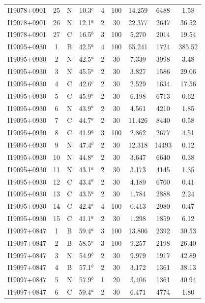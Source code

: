 \begin{table}
\begin{tabular}{ccccccccc}
I19078+0901 & 25 & N & 10.3$^{c}$ & 4 & 100 & 14.259 & 6488 & 1.58 \\
I19078+0901 & 26 & N & 12.1$^{a}$ & 2 & 30 & 22.377 & 2647 & 36.52 \\
I19078+0901 & 27 & C & 16.5$^{b}$ & 3 & 100 & 5.270 & 2014 & 19.54 \\
I19095+0930 & 1 & B & 42.5$^{a}$ & 4 & 100 & 65.241 & 1724 & 385.52 \\
I19095+0930 & 2 & N & 42.5$^{a}$ & 2 & 30 & 7.339 & 3998 & 3.48 \\
I19095+0930 & 3 & N & 45.5$^{a}$ & 2 & 30 & 3.827 & 1586 & 29.06 \\
I19095+0930 & 4 & C & 42.6$^{c}$ & 2 & 30 & 2.529 & 1634 & 17.56 \\
I19095+0930 & 5 & C & 45.9$^{a}$ & 2 & 30 & 6.198 & 6713 & 0.62 \\
I19095+0930 & 6 & N & 43.9$^{a}$ & 2 & 30 & 4.561 & 4210 & 1.85 \\
I19095+0930 & 7 & C & 44.7$^{a}$ & 2 & 30 & 11.426 & 8440 & 0.58 \\
I19095+0930 & 8 & C & 41.9$^{a}$ & 3 & 100 & 2.862 & 2677 & 4.51 \\
I19095+0930 & 9 & N & 47.4$^{b}$ & 2 & 30 & 12.318 & 14493 & 0.12 \\
I19095+0930 & 10 & N & 44.8$^{a}$ & 2 & 30 & 3.647 & 6640 & 0.38 \\
I19095+0930 & 11 & N & 43.1$^{a}$ & 2 & 30 & 3.173 & 4145 & 1.35 \\
I19095+0930 & 12 & C & 43.4$^{a}$ & 2 & 30 & 4.189 & 6760 & 0.41 \\
I19095+0930 & 13 & C & 43.5$^{a}$ & 2 & 30 & 1.784 & 2888 & 2.24 \\
I19095+0930 & 14 & C & 42.4$^{a}$ & 4 & 100 & 0.413 & 2980 & 0.47 \\
I19095+0930 & 15 & C & 41.1$^{a}$ & 2 & 30 & 1.298 & 1859 & 6.12 \\
I19097+0847 & 1 & B & 59.4$^{a}$ & 3 & 100 & 13.806 & 2392 & 30.53 \\
I19097+0847 & 2 & B & 58.5$^{a}$ & 3 & 100 & 9.257 & 2198 & 26.40 \\
I19097+0847 & 3 & N & 54.9$^{b}$ & 2 & 30 & 9.979 & 1917 & 42.89 \\
I19097+0847 & 4 & B & 57.1$^{b}$ & 2 & 30 & 3.172 & 1361 & 38.13 \\
I19097+0847 & 5 & N & 57.9$^{b}$ & 1 & 20 & 3.406 & 1361 & 40.94 \\
I19097+0847 & 6 & C & 59.4$^{a}$ & 2 & 30 & 6.471 & 4774 & 1.80 \\

\end{tabular}
\end{table}
